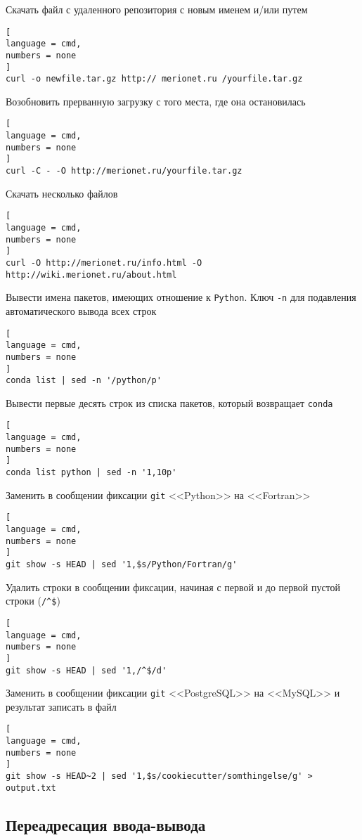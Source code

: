 \documentclass[%
	11pt,
	a4paper,
	utf8,
		]{article}
\begin{document}
Скачать файл с удаленного репозитория с новым именем и/или путем
\begin{lstlisting}[
language = cmd,
numbers = none
]
curl -o newfile.tar.gz http:// merionet.ru /yourfile.tar.gz
\end{lstlisting}

Возобновить прерванную загрузку с того места, где она остановилась
\begin{lstlisting}[
language = cmd,
numbers = none
]
curl -C - -O http://merionet.ru/yourfile.tar.gz
\end{lstlisting}

Скачать несколько файлов 
\begin{lstlisting}[
language = cmd,
numbers = none
]
curl -O http://merionet.ru/info.html -O http://wiki.merionet.ru/about.html
\end{lstlisting}

Вывести имена пакетов, имеющих отношение к \texttt{Python}. Ключ \verb|-n| для подавления автоматического вывода всех строк
\begin{lstlisting}[
language = cmd,
numbers = none
]
conda list | sed -n '/python/p' 
\end{lstlisting}

Вывести первые десять строк из списка пакетов, который возвращает \texttt{conda}
\begin{lstlisting}[
language = cmd,
numbers = none
]
conda list python | sed -n '1,10p'
\end{lstlisting}

Заменить в сообщении фиксации \texttt{git} <<Python>> на <<Fortran>>
\begin{lstlisting}[
language = cmd,
numbers = none
]
git show -s HEAD | sed '1,$s/Python/Fortran/g'
\end{lstlisting}

Удалить строки в сообщении фиксации, начиная с первой и до первой пустой строки (\verb|/^$|)
\begin{lstlisting}[
language = cmd,
numbers = none
]
git show -s HEAD | sed '1,/^$/d'
\end{lstlisting}

Заменить в сообщении фиксации \texttt{git} <<PostgreSQL>> на <<MySQL>> и результат записать в файл
\begin{lstlisting}[
language = cmd,
numbers = none
]
git show -s HEAD~2 | sed '1,$s/cookiecutter/somthingelse/g' > output.txt
\end{lstlisting}




\subsection{Переадресация ввода-вывода}
\end{document}
